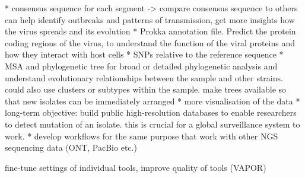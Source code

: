 * consensus sequence for each segment -> compare consensus sequence to others can help identify outbreaks and patterns of transmission, get more insights how the virus spreads and its evolution
* Prokka annotation file. Predict the protein coding regions of the virus, to understand the function of the viral proteins and how they interact with host cells
* SNPs relative to the reference sequence
* \ac{MSA} and phylogenetic tree for broad or detailed phylogenetic analysis and understand evolutionary relationships between the sample and other strains. could also use clusters or subtypes within the sample. make trees available so that new isolates can be immediately arranged
* more visualisation of the data
* long-term objective: build public high-resolution databases to enable researchers to detect mutation of an isolate. this is crucial for a global surveillance system to work.
* develop workflows for the same purpose that work with other NGS sequencing data (ONT, PacBio etc.)

fine-tune settings of individual tools, improve quality of tools (VAPOR)